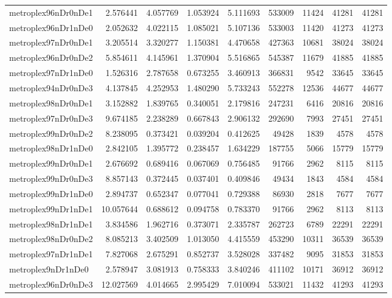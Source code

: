 \begin{longtable}{|l|r|r|r|r|r|r|r|r|}
metroplex96nDr0nDe1 & 2.576441 & 4.057769 & 1.053924 & 5.111693 & 533009 & 11424 & 41281 & 41281 \\
metroplex96nDr1nDe0 & 2.052632 & 4.022115 & 1.085021 & 5.107136 & 533003 & 11420 & 41273 & 41273 \\
metroplex97nDr0nDe1 & 3.205514 & 3.320277 & 1.150381 & 4.470658 & 427363 & 10681 & 38024 & 38024 \\
metroplex96nDr0nDe2 & 5.854611 & 4.145961 & 1.370904 & 5.516865 & 545387 & 11679 & 41885 & 41885 \\
metroplex97nDr1nDe0 & 1.526316 & 2.787658 & 0.673255 & 3.460913 & 366831 & 9542 & 33645 & 33645 \\
metroplex94nDr0nDe3 & 4.137845 & 4.252953 & 1.480290 & 5.733243 & 552278 & 12536 & 44677 & 44677 \\
metroplex98nDr0nDe1 & 3.152882 & 1.839765 & 0.340051 & 2.179816 & 247231 & 6416 & 20816 & 20816 \\
metroplex97nDr0nDe3 & 9.674185 & 2.238289 & 0.667843 & 2.906132 & 292690 & 7993 & 27451 & 27451 \\
metroplex99nDr0nDe2 & 8.238095 & 0.373421 & 0.039204 & 0.412625 & 49428 & 1839 & 4578 & 4578 \\
metroplex98nDr1nDe0 & 2.842105 & 1.395772 & 0.238457 & 1.634229 & 187755 & 5066 & 15779 & 15779 \\
metroplex99nDr0nDe1 & 2.676692 & 0.689416 & 0.067069 & 0.756485 & 91766 & 2962 & 8115 & 8115 \\
metroplex99nDr0nDe3 & 8.857143 & 0.372445 & 0.037401 & 0.409846 & 49434 & 1843 & 4584 & 4584 \\
metroplex99nDr1nDe0 & 2.894737 & 0.652347 & 0.077041 & 0.729388 & 86930 & 2818 & 7677 & 7677 \\
metroplex99nDr1nDe1 & 10.057644 & 0.688612 & 0.094758 & 0.783370 & 91766 & 2962 & 8113 & 8113 \\
metroplex98nDr1nDe1 & 3.834586 & 1.962716 & 0.373071 & 2.335787 & 262723 & 6789 & 22291 & 22291 \\
metroplex98nDr0nDe2 & 8.085213 & 3.402509 & 1.013050 & 4.415559 & 453290 & 10311 & 36539 & 36539 \\
metroplex97nDr1nDe1 & 7.827068 & 2.675291 & 0.852737 & 3.528028 & 337482 & 9095 & 31853 & 31853 \\
metroplex9nDr1nDe0 & 2.578947 & 3.081913 & 0.758333 & 3.840246 & 411102 & 10171 & 36912 & 36912 \\
metroplex96nDr0nDe3 & 12.027569 & 4.014665 & 2.995429 & 7.010094 & 533021 & 11432 & 41293 & 41293 \\

\end{longtable}
